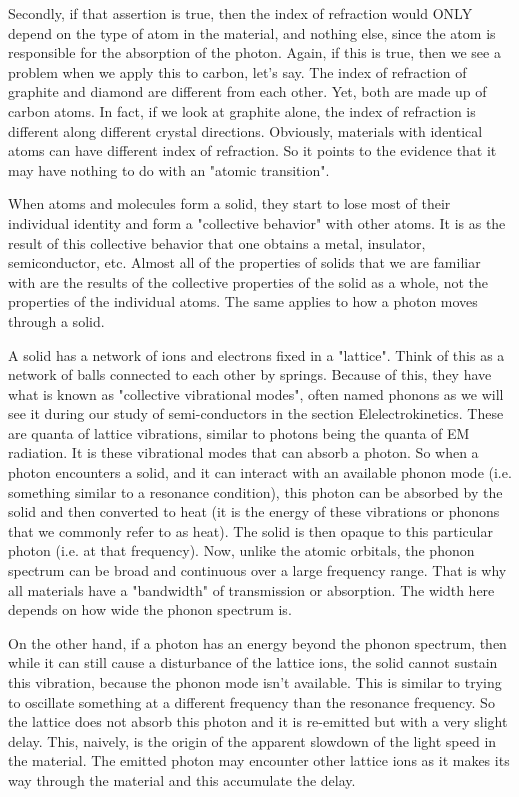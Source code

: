 	Secondly, if that assertion is true, then the index of refraction would ONLY depend on the type of atom in the material, and nothing else, since the atom is responsible for the absorption of the photon. Again, if this is true, then we see a problem when we apply this to carbon, let's say. The index of refraction of graphite and diamond are different from each other. Yet, both are made up of carbon atoms. In fact, if we look at graphite alone, the index of refraction is different along different crystal directions. Obviously, materials with identical atoms can have different index of refraction. So it points to the evidence that it may have nothing to do with an "atomic transition".

	When atoms and molecules form a solid, they start to lose most of their individual identity and form a "collective behavior" with other atoms. It is as the result of this collective behavior that one obtains a metal, insulator, semiconductor, etc. Almost all of the properties of solids that we are familiar with are the results of the collective properties of the solid as a whole, not the properties of the individual atoms. The same applies to how a photon moves through a solid.

	A solid has a network of ions and electrons fixed in a "lattice". Think of this as a network of balls connected to each other by springs. Because of this, they have what is known as "collective vibrational modes", often named phonons as we will see it during our study of semi-conductors in the section Elelectrokinetics. These are quanta of lattice vibrations, similar to photons being the quanta of EM radiation. It is these vibrational modes that can absorb a photon. So when a photon encounters a solid, and it can interact with an available phonon mode (i.e. something similar to a resonance condition), this photon can be absorbed by the solid and then converted to heat (it is the energy of these vibrations or phonons that we commonly refer to as heat). The solid is then opaque to this particular photon (i.e. at that frequency). Now, unlike the atomic orbitals, the phonon spectrum can be broad and continuous over a large frequency range. That is why all materials have a "bandwidth" of transmission or absorption. The width here depends on how wide the phonon spectrum is.
	
	On the other hand, if a photon has an energy beyond the phonon spectrum, then while it can still cause a disturbance of the lattice ions, the solid cannot sustain this vibration, because the phonon mode isn’t available. This is similar to trying to oscillate something at a different frequency than the resonance frequency. So the lattice does not absorb this photon and it is re-emitted but with a very slight delay. This, naively, is the origin of the apparent slowdown of the light speed in the material. The emitted photon may encounter other lattice ions as it makes its way through the material and this accumulate the delay. 
	
